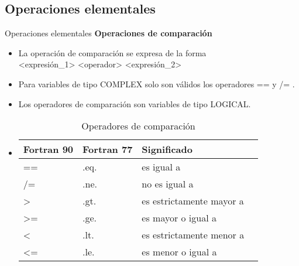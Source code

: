 
\subsection{Operaciones elementales}


\begin{frame}[fragile]{Operaciones elementales}
\textbf{Operaciones de comparación}    
 \begin{itemize}[<+(0)->]
  \item La operación de comparación se expresa de la forma \\
      \centering <expresión\_1> <operador> <expresión\_2>
  \item Para variables de tipo COMPLEX solo son válidos los operadores == y /= .
  \item Los operadores de comparación son variables de tipo LOGICAL.
    \vspace{0.4cm}
  \item []
    \begin{table}[]
    \centering
    \label{Tabla_comparacion}
    \begin{tabular}{|l|l|l|l|}
    \hline
    Fortran 90  & Fortran 77    & Significado                  \\ \hline
    ==          & .eq.          & es igual a                   \\ \hline
    /=          & .ne.          & no es igual a                \\ \hline
    >           & .gt.          & es estrictamente mayor a     \\ \hline
    >=          & .ge.          & es mayor o igual a           \\ \hline
    <           & .lt.          & es estrictamente menor a     \\ \hline
    <=          & .le.          & es menor o igual a           \\ \hline              
    \end{tabular}
    \caption*{Operadores de comparación}
    \end{table}
  
 \end{itemize}
\end{frame}